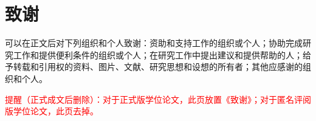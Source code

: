 \chapter*{致谢}
可以在正文后对下列组织和个人致谢：资助和支持工作的组织或个人；协助完成研究工作和提供便利条件的组织或个人；在研究工作中提出建议和提供帮助的人；给予转载和引用权的资料、图片、文献、研究思想和设想的所有者；其他应感谢的组织和个人。

\textcolor{red}{提醒（正式成文后删除）：对于正式版学位论文，此页放置《致谢》；对于匿名评阅版学位论文，此页去掉。}

